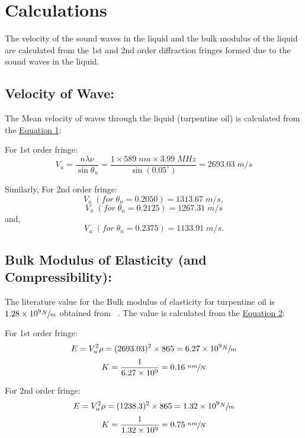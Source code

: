 \section{Calculations}

	The velocity of the sound waves in the liquid and the bulk modulus of the liquid are calculated from the 1st and 2nd order diffraction fringes formed due to the sound waves in the liquid.

	\subsection{Velocity of Wave:}
	The Mean velocity of waves through the liquid (turpentine oil) is calculated from the \hyperref[eqn:1]{Equation 1}:
	
	For 1st order fringe:
	$$
	V_u = \frac{n\lambda\nu}{\sin\theta_n}
	    = \frac{1\times 589\;nm \times 3.99\;MHz}{\sin (0.05^{\circ})}
		= 2693.03\;m/s
	$$
	
	Similarly, For 2nd order fringe:
	$$V_u\;(for\;\theta_n=0.2050) = 1313.67\;m/s,$$
	\vspace{-5.25mm}
	$$V_u\;(for\;\theta_n=0.2125) = 1267.31\;m/s$$
	\vspace{-5.25mm}
	\hspace{1.7cm}and,
	$$V_u\;(for\;\theta_n=0.2375) = 1133.91\;m/s.$$


	\subsection{Bulk Modulus of Elasticity (and Compressibility):}
	The literature value for the Bulk modulus of elasticity for turpentine oil is $1.28\times 10^9\sfrac{N}{m}$ obtained from ~\cite{bulkmodulus}. The value is calculated from the \hyperref[eqn:2]{Equation 2}:

	For 1st order fringe:
	$$E = V_u^2\rho = (2693.03)^2\times865 =6.27\times 10^9\sfrac{N}{m}$$
	$$K = \frac{1}{6.27\times 10^9} = 0.16\;\sfrac{nm}{N}$$

	For 2nd order fringe:
	$$E = V_u^2\rho = (1238.3)^2\times865 = 1.32\times 10^9\sfrac{N}{m}$$
	$$K = \frac{1}{1.32\times 10^9} = 0.75\;\sfrac{nm}{N}$$

